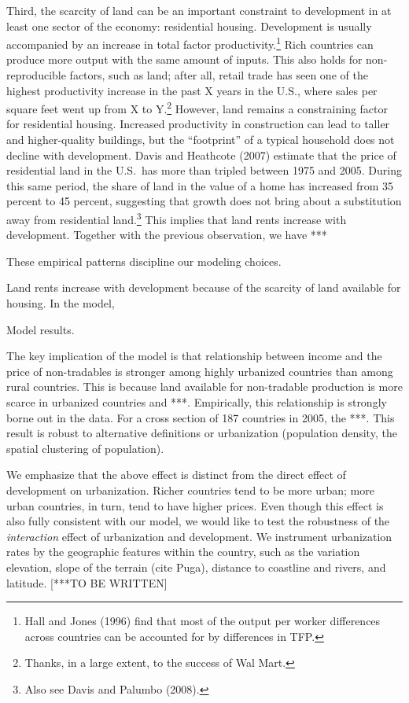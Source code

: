 \documentclass[12pt]{article}
\begin{document}
Third, the scarcity of land can be an important constraint to development in at least one sector of the economy: residential housing. Development is usually accompanied by an increase in total factor productivity.\footnote{Hall and Jones (1996) find that most of the output per worker differences across countries can be accounted for by differences in TFP.} Rich countries can produce more output with the same amount of inputs. This also holds for non-reproducible factors, such as land; after all, retail trade has seen one of the highest productivity increase in the past X years in the U.S., where sales per square feet went up from X to Y.\footnote{Thanks, in a large extent, to the success of Wal Mart.} However, land remains a constraining factor for residential housing. Increased productivity in construction can lead to taller and higher-quality buildings, but the ``footprint'' of a typical household does not decline with development. Davis and Heathcote (2007) estimate that the price of residential land in the U.S.~has more than tripled between 1975 and 2005. During this same period, the share of land in the value of a home has increased from 35 percent to 45 percent, suggesting that growth does not bring about a substitution away from residential land.\footnote{Also see Davis and Palumbo (2008).} This implies that land rents increase with development. Together with the previous observation, we have ***

These empirical patterns discipline our modeling choices.

Land rents increase with development because of the scarcity of land available for housing. In the model,

Model results.

The key implication of the model is that relationship between income and the price of non-tradables is stronger among highly urbanized countries than among rural countries. This is because land available for non-tradable production is more scarce in urbanized countries and ***. Empirically, this relationship is strongly borne out in the data. For a cross section of 187 countries in 2005, the ***. This result is robust to alternative definitions or urbanization (population density, the spatial clustering of population).

We emphasize that the above effect is distinct from the direct effect of development on urbanization. Richer countries tend to be more urban; more urban countries, in turn, tend to have higher prices. Even though this effect is also fully consistent with our model, we would like to test the robustness of the \emph{interaction} effect of urbanization and development. We instrument urbanization rates by the geographic features within the country, such as the variation elevation, slope of the terrain (cite Puga), distance to coastline and rivers, and latitude. [***TO BE WRITTEN]
\end{document}
